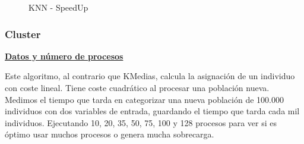 			\begin{figure} [!h]
				\centering
				\caption{KNN - SpeedUp}
			\end{figure}
			
			\newpage
		
		\subsubsection{Cluster}
		
			\begin{flushleft}
			\begin{mdframed}[roundcorner=5pt]			
				\textbf{\underline{Datos y número de procesos}}
				\vspace{0.1cm}
				
				\scriptsize	
				Este algoritmo, al contrario que KMedias, calcula la asignación de un individuo con coste lineal. Tiene coste cuadrático al procesar una población nueva. Medimos el tiempo que tarda en categorizar una nueva población de 100.000 individuos con dos variables de entrada, guardando el tiempo que tarda cada mil individuos. Ejecutando 10, 20, 35, 50, 75, 100 y 128 procesos para ver si es óptimo usar muchos procesos o genera mucha sobrecarga.
			\end{mdframed}
			\end{flushleft}	

			
